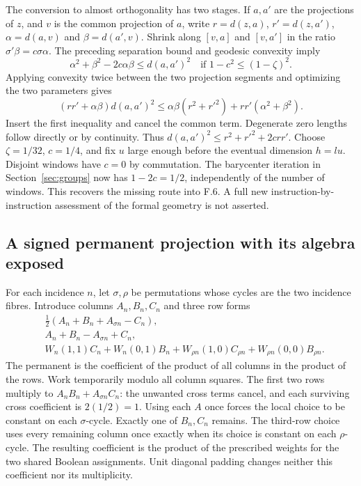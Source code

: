 \documentclass[11pt,letterpaper]{article}
\theoremstyle{definition}\newtheorem{definition}[theorem]{Definition}\newtheorem{example}[theorem]{Example}
\theoremstyle{remark}\newtheorem{remark}[theorem]{Remark}
\begin{document}
The conversion to almost orthogonality has two stages. If $a,a'$ are the projections of $z$, and $v$ is the common projection of $a$, write $r=d(z,a)$, $r'=d(z,a')$, $\alpha=d(a,v)$ and $\beta=d(a',v)$. Shrink along $[v,a]$ and $[v,a']$ in the ratio $\sigma'\beta=c\sigma\alpha$. The preceding separation bound and geodesic convexity imply
\[
 \alpha^2+\beta^2-2c\alpha\beta\le d(a,a')^2
 \quad\text{if }1-c^2\le(1-\zeta)^2.
\]
Applying convexity twice between the two projection segments and optimizing the two parameters gives
\[
 (rr'+\alpha\beta)d(a,a')^2
 \le\alpha\beta(r^2+r'^2)+rr'(\alpha^2+\beta^2).
\]
Insert the first inequality and cancel the common term. Degenerate zero lengths follow directly or by continuity. Thus $d(a,a')^2\le r^2+r'^2+2crr'$. Choose $\zeta=1/32$, $c=1/4$, and fix $u$ large enough before the eventual dimension $h=lu$. Disjoint windows have $c=0$ by commutation. The barycenter iteration in Section~\ref{sec:groups} now has $1-2c=1/2$, independently of the number of windows. This recovers the missing route into F.6. A full new instruction-by-instruction assessment of the formal geometry is not asserted.

\subsection{A signed permanent projection with its algebra exposed}\label{sec:permdetail}
For each incidence $n$, let $\sigma,\rho$ be permutations whose cycles are the two incidence fibres. Introduce columns $A_n,B_n,C_n$ and three row forms
\begin{align*}
 &\tfrac12(A_n+B_n+A_{\sigma n}-C_n),\\
 &A_n+B_n-A_{\sigma n}+C_n,\\
 &W_n(1,1)C_n+W_n(0,1)B_n+
     W_{\rho n}(1,0)C_{\rho n}+W_{\rho n}(0,0)B_{\rho n}.
\end{align*}
The permanent is the coefficient of the product of all columns in the product of the rows. Work temporarily modulo all column squares. The first two rows multiply to $A_nB_n+A_{\sigma n}C_n$: the unwanted cross terms cancel, and each surviving cross coefficient is $2(1/2)=1$. Using each $A$ once forces the local choice to be constant on each $\sigma$-cycle. Exactly one of $B_n,C_n$ remains. The third-row choice uses every remaining column once exactly when its choice is constant on each $\rho$-cycle. The resulting coefficient is the product of the prescribed weights for the two shared Boolean assignments. Unit diagonal padding changes neither this coefficient nor its multiplicity.
\end{document}
